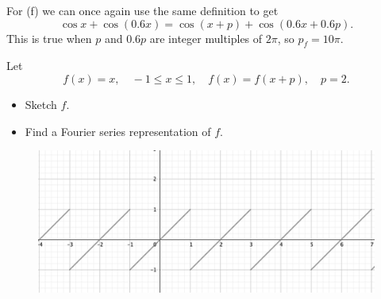 For (f) we can once again use the same definition to get
\[ 
\cos x + \cos \left( \num{0,6} x \right) = \cos \left( x + p \right) + \cos \left( \num{0,6} x + \num{0,6} p \right)
.\]
This is true when $p$ and $\num{0,6} p$ are integer multiples of $2\pi$, so $p_f = 10\pi$. 


Let
\[ 
f(x) = x, \quad -1 \leq x \leq 1, \quad f(x) = f(x + p), \quad p = 2
.\]
\begin{itemize}
  \item Sketch $f$.
  \item Find a Fourier series representation of $f$.
\end{itemize}

\begin{figure} [ht]
  \centering
  \includegraphics[width=0.5\linewidth]{./figures/e1_2.png}
  \caption{}
  \label{fig:e1_2}
\end{figure}

